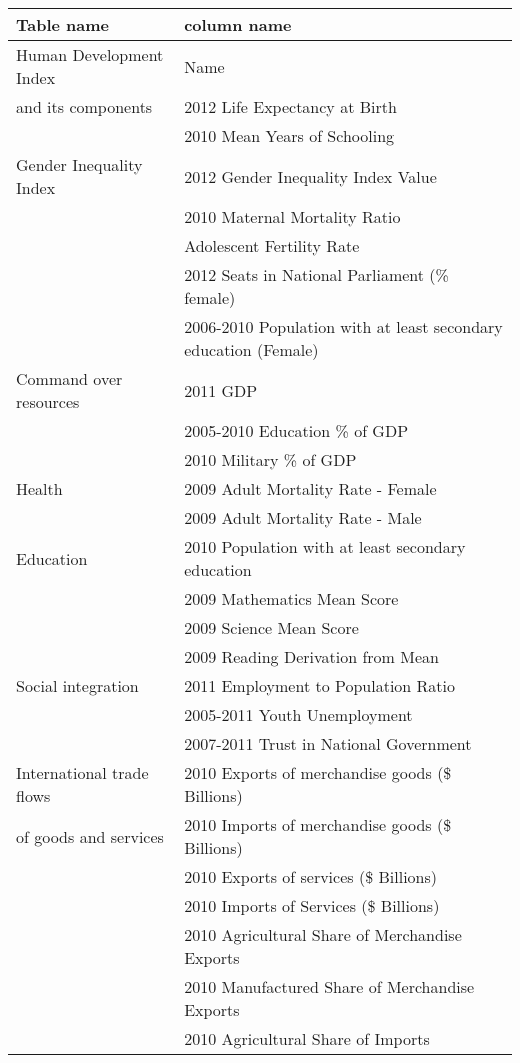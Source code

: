 \documentclass[a4paper,11pt]{article}
\begin{document}
\begin{table}
	\begin{tabular}{|l|l|}
		\hline
		Table name & column name\\ 
		\hline
		Human Development Index & Name \\
		and its components & 2012 Life Expectancy at Birth\\
		& 2010 Mean Years of Schooling\\
		\hline
		Gender Inequality Index & 2012 Gender Inequality Index Value\\
		& 2010 Maternal Mortality Ratio\\
		& Adolescent Fertility Rate\\
		& 2012 Seats in National Parliament (\% female)\\
		& 2006-2010 Population with at least secondary education (Female)\\
		\hline
		Command over resources & 2011 GDP\\
		& 2005-2010 Education \% of GDP\\
		& 2010 Military \% of GDP\\
		\hline
		Health & 2009 Adult Mortality Rate - Female\\
		& 2009 Adult Mortality Rate - Male\\ 
		\hline
		Education & 2010 Population with at least secondary education\\
		& 2009 Mathematics Mean Score\\
		& 2009 Science Mean Score\\ 
		& 2009 Reading Derivation from Mean\\
		\hline
		Social integration & 2011 Employment to Population Ratio\\
		& 2005-2011 Youth Unemployment\\
		& 2007-2011 Trust in National Government\\
		\hline
		International trade flows & 2010 Exports of merchandise goods (\$ Billions)\\
		of goods and services & 2010 Imports of merchandise goods (\$ Billions)\\
		& 2010 Exports of services (\$ Billions)\\
		& 2010 Imports of Services (\$ Billions)\\
		& 2010 Agricultural Share of Merchandise Exports\\
		& 2010 Manufactured Share of Merchandise Exports\\
		& 2010 Agricultural Share of Imports \\

\end{tabular}
\end{table}
\end{document}

